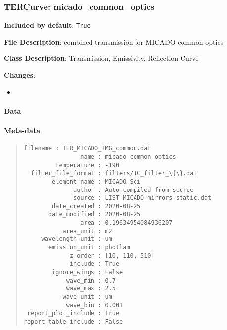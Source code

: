 \subsubsection{TERCurve: \textquotedbl{}micado\_common\_optics\textquotedbl{}%
  \label{tercurve-micado-common-optics}%
}

\textbf{Included by default}: \texttt{True}

\textbf{File Description}: combined transmission for MICADO common optics

\textbf{Class Description}: Transmission, Emissivity, Reflection Curve

\textbf{Changes}:

\begin{itemize}
\item \end{itemize}


\paragraph{Data%
  \label{data}%
}

\begin{figure}[H]
\noindent{}\label{fig-micado-common-optics}
\end{figure}


\paragraph{Meta-data%
  \label{meta-data}%
}

\begin{quote}
\begin{alltt}
\begin{lstlisting}[frame=single]
            filename : TER_MICADO_IMG_common.dat
                name : micado_common_optics
         temperature : -190
  filter_file_format : filters/TC_filter_\{\}.dat
        element_name : MICADO_Sci
              author : Auto-compiled from source
              source : LIST_MICADO_mirrors_static.dat
        date_created : 2020-08-25
       date_modified : 2020-08-25
                area : 0.19634954084936207
           area_unit : m2
     wavelength_unit : um
       emission_unit : photlam
             z_order : [10, 110, 510]
             include : True
        ignore_wings : False
            wave_min : 0.7
            wave_max : 2.5
           wave_unit : um
            wave_bin : 0.001
 report_plot_include : True
report_table_include : False
\end{lstlisting}
\end{alltt}
\end{quote}


